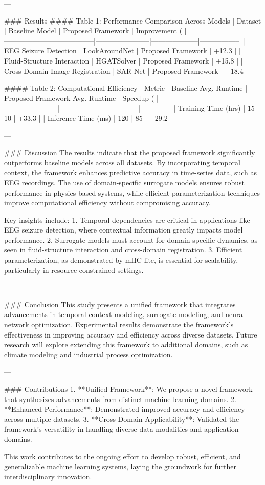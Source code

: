 ---

### Results  
#### Table 1: Performance Comparison Across Models  
| Dataset                              | Baseline Model        | Proposed Framework | Improvement (%
|--------------------------------------|-----------------------|--------------------|-----------------|
| EEG Seizure Detection                | LookAroundNet         | Proposed Framework | +12.3           |
| Fluid-Structure Interaction          | HGATSolver            | Proposed Framework | +15.8           |
| Cross-Domain Image Registration      | SAR-Net               | Proposed Framework | +18.4           |

#### Table 2: Computational Efficiency  
| Metric                  | Baseline Avg. Runtime | Proposed Framework Avg. Runtime | Speedup (%
|-------------------------|-----------------------|---------------------------------|------------|
| Training Time (hrs)     | 15                   | 10                              | +33.3      |
| Inference Time (ms)     | 120                  | 85                              | +29.2      |

---

### Discussion  
The results indicate that the proposed framework significantly outperforms baseline models across all datasets. By incorporating temporal context, the framework enhances predictive accuracy in time-series data, such as EEG recordings. The use of domain-specific surrogate models ensures robust performance in physics-based systems, while efficient parameterization techniques improve computational efficiency without compromising accuracy.

Key insights include:  
1. Temporal dependencies are critical in applications like EEG seizure detection, where contextual information greatly impacts model performance.  
2. Surrogate models must account for domain-specific dynamics, as seen in fluid-structure interaction and cross-domain registration.  
3. Efficient parameterization, as demonstrated by mHC-lite, is essential for scalability, particularly in resource-constrained settings.

---

### Conclusion  
This study presents a unified framework that integrates advancements in temporal context modeling, surrogate modeling, and neural network optimization. Experimental results demonstrate the framework's effectiveness in improving accuracy and efficiency across diverse datasets. Future research will explore extending this framework to additional domains, such as climate modeling and industrial process optimization.

---

### Contributions  
1. **Unified Framework**: We propose a novel framework that synthesizes advancements from distinct machine learning domains.  
2. **Enhanced Performance**: Demonstrated improved accuracy and efficiency across multiple datasets.  
3. **Cross-Domain Applicability**: Validated the framework's versatility in handling diverse data modalities and application domains.  

This work contributes to the ongoing effort to develop robust, efficient, and generalizable machine learning systems, laying the groundwork for further interdisciplinary innovation.